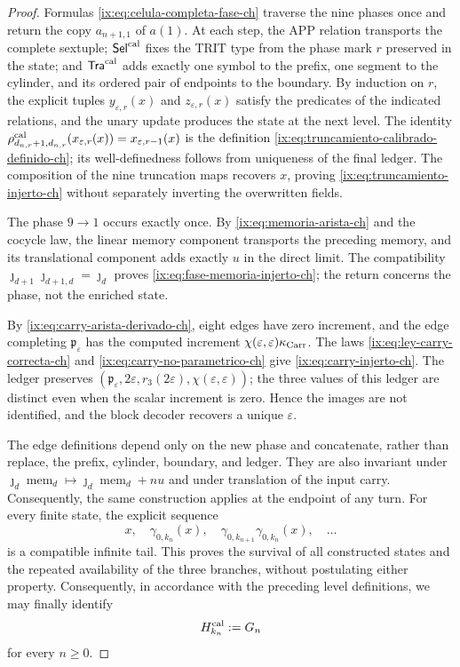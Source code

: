\begin{proof}
Formulas \eqref{ix:eq:celula-completa-fase-ch} traverse the nine phases once and
return the copy \(a_{n+1,1}\) of \(a(1)\). At each step, the APP relation
transports the complete sextuple; \(\mathsf{Sel}^{\rm cal}\) fixes the TRIT
type from the phase mark \(r\) preserved in the state; and
\(\mathsf{Tra}^{\rm cal}\) adds exactly one symbol to the prefix, one segment
to the cylinder, and its ordered pair of endpoints to the boundary. By
induction on \(r\), the explicit tuples \(y_{\varepsilon,r}(x)\) and
\(z_{\varepsilon,r}(x)\) satisfy the predicates of the indicated relations,
and the unary update produces the state at the next level. The identity
\(\rho^{\rm cal}_{d_{n,r}+1,d_{n,r}}
(x_{\varepsilon,r}(x))=x_{\varepsilon,r-1}(x)\) is the definition
\eqref{ix:eq:truncamiento-calibrado-definido-ch}; its well-definedness follows
from uniqueness of the final ledger. The composition of the nine truncation
maps recovers \(x\), proving \eqref{ix:eq:truncamiento-injerto-ch} without
separately inverting the overwritten fields.

The phase \(9\to1\) occurs exactly once. By
\eqref{ix:eq:memoria-arista-ch} and the cocycle law, the linear memory component
transports the preceding memory, and its translational component adds exactly
\(u\) in the direct limit. The compatibility
\(\jmath_{d+1}\jmath_{d+1,d}=\jmath_d\) proves
\eqref{ix:eq:fase-memoria-injerto-ch}; the return concerns the phase, not the
enriched state.

By \eqref{ix:eq:carry-arista-derivado-ch}, eight edges have zero increment, and
the edge completing \(\mathfrak p_\varepsilon\) has the computed increment
\(\chi(\varepsilon,\varepsilon)\kappa_{\rm Carr}\). The laws
\eqref{ix:eq:ley-carry-correcta-ch} and
\eqref{ix:eq:carry-no-parametrico-ch}
give \eqref{ix:eq:carry-injerto-ch}. The ledger preserves
\((\mathfrak p_\varepsilon,2\varepsilon,r_3(2\varepsilon),
\chi(\varepsilon,\varepsilon))\); the three values of this ledger are
distinct even when the scalar increment is zero. Hence the images are not
identified, and the block decoder recovers a unique \(\varepsilon\).

The edge definitions depend only on the new phase and concatenate, rather than
replace, the prefix, cylinder, boundary, and ledger. They are also invariant
under
\(\jmath_d\operatorname{mem}_d\mapsto
  \jmath_d\operatorname{mem}_d+nu\)
and under translation of the input carry. Consequently, the same construction
applies at the endpoint of any turn. For every finite state, the explicit
sequence
\[
 x,\quad\gamma_{0,k_n}(x),\quad
 \gamma_{0,k_{n+1}}\gamma_{0,k_n}(x),\quad\ldots
\]
is a compatible infinite tail. This proves the survival of all constructed
states and the repeated availability of the three branches, without
postulating either property. Consequently, in accordance with the preceding
level definitions, we may finally identify
\begin{equation}
 H_{k_n}^{\rm cal}:=G_n
 \label{ix:eq:subarbol-calibrado-superviviente-ch}
\end{equation}
for every \(n\ge0\).
\end{proof}

